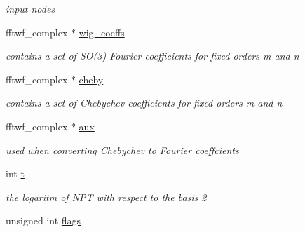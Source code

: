 \begin{DoxyCompactItemize}
\begin{DoxyCompactList}\small\item\em input nodes \end{DoxyCompactList}\item 
\hypertarget{structnfsoftf__plan___a1d6f6e5b95a8f0ff13add5c23b382fb9}{fftwf\-\_\-complex $\ast$ \hyperlink{structnfsoftf__plan___a1d6f6e5b95a8f0ff13add5c23b382fb9}{wig\-\_\-coeffs}}\label{structnfsoftf__plan___a1d6f6e5b95a8f0ff13add5c23b382fb9}

\begin{DoxyCompactList}\small\item\em contains a set of S\-O(3) Fourier coefficients for fixed orders m and n \end{DoxyCompactList}\item 
\hypertarget{structnfsoftf__plan___a73e75b0a9f8ceebffe6923c90c04c312}{fftwf\-\_\-complex $\ast$ \hyperlink{structnfsoftf__plan___a73e75b0a9f8ceebffe6923c90c04c312}{cheby}}\label{structnfsoftf__plan___a73e75b0a9f8ceebffe6923c90c04c312}

\begin{DoxyCompactList}\small\item\em contains a set of Chebychev coefficients for fixed orders m and n \end{DoxyCompactList}\item 
\hypertarget{structnfsoftf__plan___a5f7c39509a2403a9bc17824be7a3c3a9}{fftwf\-\_\-complex $\ast$ \hyperlink{structnfsoftf__plan___a5f7c39509a2403a9bc17824be7a3c3a9}{aux}}\label{structnfsoftf__plan___a5f7c39509a2403a9bc17824be7a3c3a9}

\begin{DoxyCompactList}\small\item\em used when converting Chebychev to Fourier coeffcients \end{DoxyCompactList}\item 
\hypertarget{structnfsoftf__plan___a21641301ce6613d250e6d683c3fad9c2}{int \hyperlink{structnfsoftf__plan___a21641301ce6613d250e6d683c3fad9c2}{t}}\label{structnfsoftf__plan___a21641301ce6613d250e6d683c3fad9c2}

\begin{DoxyCompactList}\small\item\em the logaritm of N\-P\-T with respect to the basis 2 \end{DoxyCompactList}\item 
\hypertarget{structnfsoftf__plan___a55301d3525d6457aebd0237871dee668}{unsigned int \hyperlink{structnfsoftf__plan___a55301d3525d6457aebd0237871dee668}{flags}}\label{structnfsoftf__plan___a55301d3525d6457aebd0237871dee668}


\end{DoxyCompactItemize}

